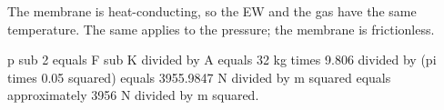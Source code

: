 The membrane is heat-conducting, so the EW and the gas have the same temperature.  
The same applies to the pressure; the membrane is frictionless.  

p sub 2 equals F sub K divided by A equals 32 kg times 9.806 divided by (pi times 0.05 squared) equals 3955.9847 N divided by m squared equals approximately 3956 N divided by m squared.
